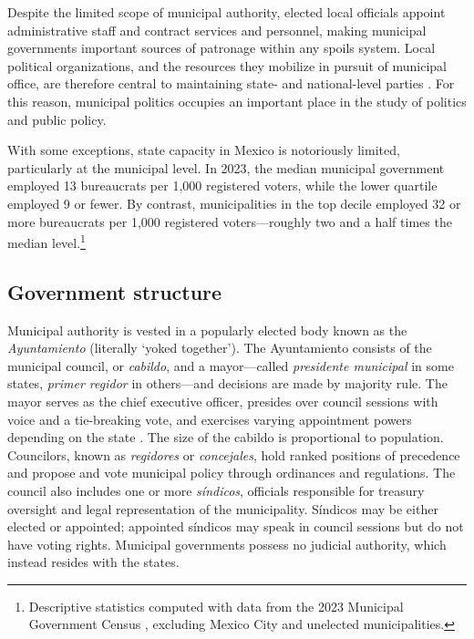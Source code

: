 \documentclass[letter,12pt]{article}
\begin{document}
Despite the limited scope of municipal authority, elected local officials appoint administrative staff and contract services and personnel, making municipal governments important sources of patronage within any spoils system. Local political organizations, and the resources they mobilize in pursuit of municipal office, are therefore central to maintaining state- and national-level parties \citep{ames.1970, coppedge.MxVen.1993, key.1964, rosas.lucardi.Brokers.2019}. For this reason, municipal politics occupies an important place in the study of politics and public policy.

With some exceptions, state capacity in Mexico is notoriously limited, particularly at the municipal level. In 2023, the median municipal government employed 13 bureaucrats per 1,000 registered voters, while the lower quartile employed 9 or fewer. By contrast, municipalities in the top decile employed 32 or more bureaucrats per 1,000 registered voters---roughly two and a half times the median level.\footnote{Descriptive statistics computed with data from the 2023 Municipal Government Census \citep{inegi.CensoGobMun2023}, excluding Mexico City and unelected municipalities.}

\subsection{Government structure}\label{S:structure}
Municipal authority is vested in a popularly elected body known as the \emph{Ayuntamiento} (literally `yoked together'). The Ayuntamiento consists of the municipal council, or \emph{cabildo}, and a mayor---called \emph{presidente municipal} in some states, \emph{primer regidor} in others---and decisions are made by majority rule. The mayor serves as the chief executive officer, presides over council sessions with voice and a tie-breaking vote, and exercises varying appointment powers depending on the state \citep{robles-mtz.Municipio.2009, rmz-millan.2000}. The size of the cabildo is proportional to population. Councilors, known as \emph{regidores} or \emph{concejales}, hold ranked positions of precedence and propose and vote municipal policy through ordinances and regulations. The council also includes one or more \emph{síndicos}, officials responsible for treasury oversight and legal representation of the municipality. Síndicos may be either elected or appointed; appointed síndicos may speak in council sessions but do not have voting rights. Municipal governments possess no judicial authority, which instead resides with the states.
\end{document}
